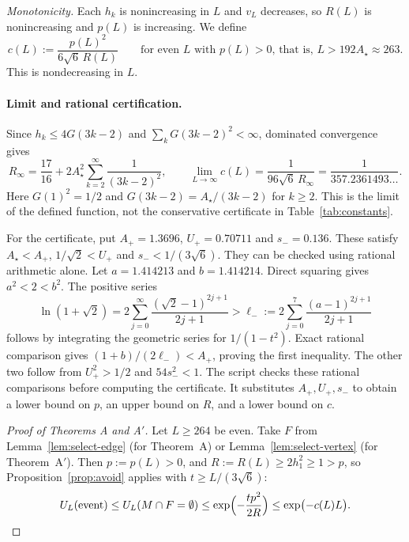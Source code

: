 \emph{Monotonicity.} Each $h_k$ is nonincreasing in $L$ and $v_L$ decreases, so $R(L)$ is nonincreasing and $p(L)$ is increasing. We define
\begin{equation}\label{eq:cL}
  c(L):=\frac{p(L)^2}{6\sqrt6\,R(L)}\qquad\text{for even $L$ with $p(L)>0$, that is, $L>192A_\star\approx263$.}
\end{equation}
This is nondecreasing in $L$.

\paragraph{Limit and rational certification.} Since $h_k\le4G(3k-2)$ and $\sum_kG(3k-2)^2<\infty$, dominated convergence gives
\[
  R_\infty=\frac{17}{16}+2A_\star^2\sum_{k=2}^\infty\frac1{(3k-2)^2},
  \qquad
  \lim_{L\to\infty}c(L)=\frac1{96\sqrt6\,R_\infty}
  =\frac1{357.2361493\ldots}.
\]
Here $G(1)^2=1/2$ and $G(3k-2)=A_\star/(3k-2)$ for $k\ge2$. This is the limit of the defined function, not the conservative certificate in Table~\ref{tab:constants}.

For the certificate, put $A_+=1.3696$, $U_+=0.70711$ and $s_-=0.136$. These satisfy $A_\star<A_+$, $1/\sqrt2<U_+$ and $s_-<1/(3\sqrt6)$. They can be checked using rational arithmetic alone. Let $a=1.414213$ and $b=1.414214$. Direct squaring gives $a^2<2<b^2$. The positive series
\[
  \ln(1+\sqrt2)=2\sum_{j=0}^\infty\frac{(\sqrt2-1)^{2j+1}}{2j+1}
  >\ell_-:=2\sum_{j=0}^7\frac{(a-1)^{2j+1}}{2j+1}
\]
follows by integrating the geometric series for $1/(1-t^2)$. Exact rational comparison gives $(1+b)/(2\ell_-)<A_+$, proving the first inequality. The other two follow from $U_+^2>1/2$ and $54s_-^2<1$. The script checks these rational comparisons before computing the certificate. It substitutes $A_+,U_+,s_-$ to obtain a lower bound on $p$, an upper bound on $R$, and a lower bound on $c$.

\begin{proof}[Proof of Theorems A and A$'$]
Let $L\ge264$ be even. Take $F$ from Lemma~\ref{lem:select-edge} (for Theorem~A) or Lemma~\ref{lem:select-vertex} (for Theorem~A$'$). Then $p:=p(L)>0$, and $R:=R(L)\ge2h_1^2\ge1>p$, so Proposition~\ref{prop:avoid} applies with $t\ge L/(3\sqrt6)$:
\[
  U_L(\text{event})\le U_L(M\cap F=\emptyset)\le\exp\Bigl(-\frac{tp^2}{2R}\Bigr)\le\exp\bigl(-c(L)L\bigr).\qedhere
\]
\end{proof}

